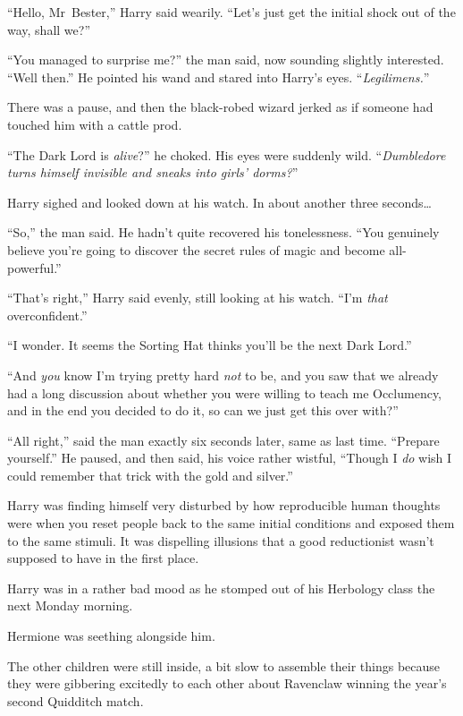 “Hello, Mr~Bester,” Harry said wearily. “Let’s just get the initial shock out of the way, shall we?”

“You managed to surprise me?” the man said, now sounding slightly interested. “Well then.” He pointed his wand and stared into Harry’s eyes. “\emph{Legilimens.}”

There was a pause, and then the black-robed wizard jerked as if someone had touched him with a cattle prod.

“The Dark Lord is \emph{alive}?” he choked. His eyes were suddenly wild. “\emph{Dumbledore turns himself invisible and sneaks into girls’ dorms?}”

Harry sighed and looked down at his watch. In about another three seconds…

“So,” the man said. He hadn’t quite recovered his tonelessness. “You genuinely believe you’re going to discover the secret rules of magic and become all-powerful.”

“That’s right,” Harry said evenly, still looking at his watch. “I’m \emph{that} overconfident.”

“I wonder. It seems the Sorting Hat thinks you’ll be the next Dark Lord.”

“And \emph{you} know I’m trying pretty hard \emph{not} to be, and you saw that we already had a long discussion about whether you were willing to teach me Occlumency, and in the end you decided to do it, so can we just get this over with?”

“All right,” said the man exactly six seconds later, same as last time. “Prepare yourself.” He paused, and then said, his voice rather wistful, “Though I \emph{do} wish I could remember that trick with the gold and silver.”

Harry was finding himself very disturbed by how reproducible human thoughts were when you reset people back to the same initial conditions and exposed them to the same stimuli. It was dispelling illusions that a good reductionist wasn’t supposed to have in the first place.

\later

Harry was in a rather bad mood as he stomped out of his Herbology class the next Monday morning.

Hermione was seething alongside him.

The other children were still inside, a bit slow to assemble their things because they were gibbering excitedly to each other about Ravenclaw winning the year’s second Quidditch match.

